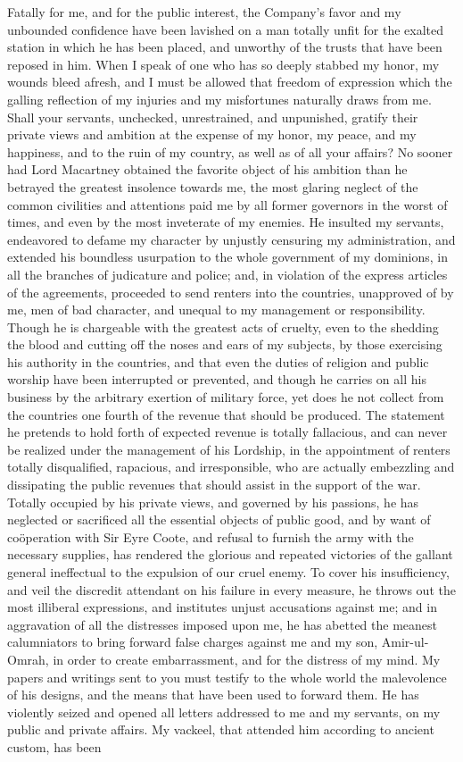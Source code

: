 Fatally for me, and for the public interest, the Company's favor and my unbounded confidence have been lavished on a man totally unfit for the exalted station in which he has been placed, and unworthy of the trusts that have been reposed in him. When I speak of one who has so deeply stabbed my honor, my wounds bleed afresh, and I must be allowed that freedom of expression which the galling reflection of my injuries and my misfortunes naturally draws from me. Shall your servants, unchecked, unrestrained, and unpunished, gratify their private views and ambition at the expense of my honor, my peace, and my happiness, and to the ruin of my country, as well as of all your affairs? No sooner had Lord Macartney obtained the favorite object of his ambition than he betrayed the greatest insolence towards me, the most glaring neglect of the common civilities and attentions paid me by all former governors in the worst of times, and even by the most inveterate of my enemies. He insulted my servants, endeavored to defame my character by unjustly censuring my administration, and extended his boundless usurpation to the whole government of my dominions, in all the branches of judicature and police; and, in violation of the express articles of the agreements, proceeded to send renters into the countries, unapproved of by me, men of bad character, and unequal to my management or responsibility. Though he is chargeable with the greatest acts of cruelty, even to the shedding the blood and cutting off the noses and ears of my subjects, by those exercising his authority in the countries, and that even the duties of religion and public worship have been interrupted or prevented, and though he carries on all his business by the arbitrary exertion of military force, yet does he not collect from the countries one fourth of the revenue that should be produced. The statement he pretends to hold forth of expected revenue is totally fallacious, and can never be realized under the management of his Lordship, in the appointment of renters totally disqualified, rapacious, and irresponsible, who are actually embezzling and dissipating the public revenues that should assist in the support of the war. Totally occupied by his private views, and governed by his passions, he has neglected or sacrificed all the essential objects of public good, and by want of coöperation with Sir Eyre Coote, and refusal to furnish the army with the necessary supplies, has rendered the glorious and repeated victories of the gallant general ineffectual to the expulsion of our cruel enemy. To cover his insufficiency, and veil the discredit attendant on his failure in every measure, he throws out the most illiberal expressions, and institutes unjust accusations against me; and in aggravation of all the distresses imposed upon me, he has abetted the meanest calumniators to bring forward false charges against me and my son, Amir-ul-Omrah, in order to create embarrassment, and for the distress of my mind. My papers and writings sent to you must testify to the whole world the malevolence of his designs, and the means that have been used to forward them. He has violently seized and opened all letters addressed to me and my servants, on my public and private affairs. My vackeel, that attended him according to ancient custom, has been 
